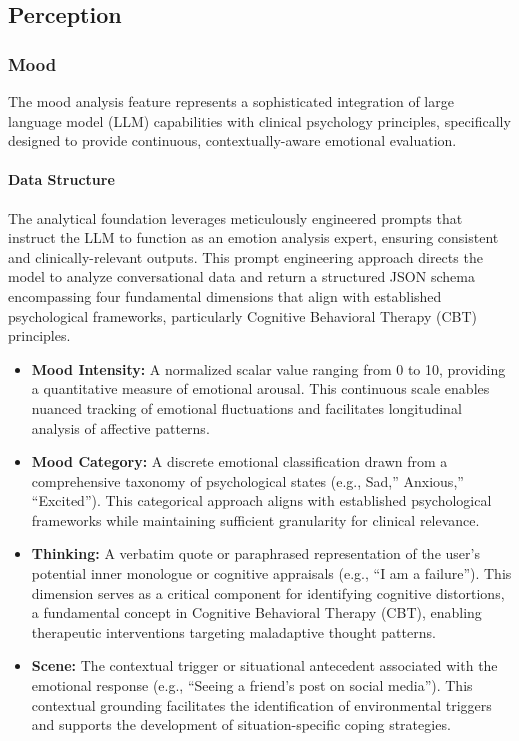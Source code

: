 \subsection{Perception}

\subsubsection{Mood}

The mood analysis feature represents a sophisticated integration of large language model (LLM) capabilities with clinical psychology principles, specifically designed to provide continuous, contextually-aware emotional evaluation.

\paragraph{Data Structure}

The analytical foundation leverages meticulously engineered prompts that instruct the LLM to function as an emotion analysis expert, ensuring consistent and clinically-relevant outputs. This prompt engineering approach directs the model to analyze conversational data and return a structured JSON schema encompassing four fundamental dimensions that align with established psychological frameworks, particularly Cognitive Behavioral Therapy (CBT) principles.

\begin{itemize}
\item \textbf{Mood Intensity:} A normalized scalar value ranging from 0 to 10, providing a quantitative measure of emotional arousal. This continuous scale enables nuanced tracking of emotional fluctuations and facilitates longitudinal analysis of affective patterns.

\item \textbf{Mood Category:} A discrete emotional classification drawn from a comprehensive taxonomy of psychological states (e.g., Sad,'' Anxious,'' ``Excited''). This categorical approach aligns with established psychological frameworks while maintaining sufficient granularity for clinical relevance.

\item \textbf{Thinking:} A verbatim quote or paraphrased representation of the user's potential inner monologue or cognitive appraisals (e.g., ``I am a failure''). This dimension serves as a critical component for identifying cognitive distortions, a fundamental concept in Cognitive Behavioral Therapy (CBT), enabling therapeutic interventions targeting maladaptive thought patterns.

\item \textbf{Scene:} The contextual trigger or situational antecedent associated with the emotional response (e.g., ``Seeing a friend's post on social media''). This contextual grounding facilitates the identification of environmental triggers and supports the development of situation-specific coping strategies.
\end{itemize}

